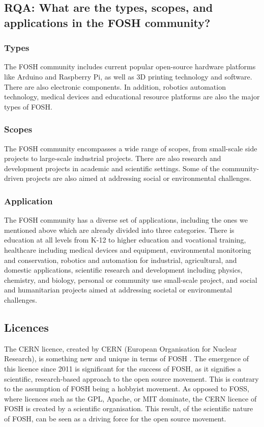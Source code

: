 \documentclass[final-report.tex]{subfiles}
\begin{document}
\subsection{RQA: What are the types, scopes, and applications in the FOSH community?}

\subsubsection{Types} 
The FOSH community includes current popular open-source hardware platforms like Arduino and Raspberry Pi, as well as 3D printing technology and software. There are also electronic components. In addition, robotics automation technology, medical devices and educational resource platforms are also the major types of FOSH.

\subsubsection{Scopes}
The FOSH community encompasses a wide range of scopes, from small-scale side projects to large-scale industrial projects. There are also research and development projects in academic and scientific settings. Some of the community-driven projects are also aimed at addressing social or environmental challenges.

\subsubsection{Application}
The FOSH community has a diverse set of applications, including the ones we mentioned above which are already divided into three categories. 
There is education at all levels from K-12 to higher education and vocational training, healthcare including medical devices and equipment, environmental monitoring and conservation, robotics and automation for industrial, agricultural, and domestic applications, scientific research and development including physics, chemistry, and biology, personal or community use small-scale project, and social and humanitarian projects aimed at addressing societal or environmental challenges.

\subsection{Licences}
The CERN licence, created by CERN (European Organisation for Nuclear Research), is something new and unique in terms of FOSH \cite{cern_launch}. 
The emergence of this licence since 2011 is significant for the success of FOSH, as it signifies a scientific, research-based approach to the open source movement. 
This is contrary to the assumption of FOSH being a hobbyist movement.
As opposed to FOSS, where licences such as the GPL, Apache, or MIT dominate, the CERN licence of FOSH is created by a scientific organisation.
This result, of the scientific nature of FOSH, can be seen as a driving force for the open source movement. 
\end{document}
